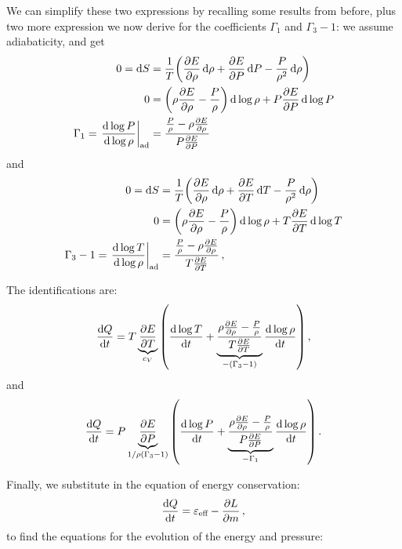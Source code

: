 \documentclass[main.tex]{subfiles}
\begin{document}
We can simplify these two expressions by recalling some results from before, plus two more expression we now derive for the coefficients \(\Gamma_1\) and \(\Gamma_3 -1\): we assume adiabaticity, and get
%
\begin{subequations}
\begin{align}
0=\dd{S} &= \frac{1}{T} \qty(\pdv{E}{\rho } \dd{\rho } + \pdv{E}{P } \dd{P} - \frac{P}{\rho^2} \dd{\rho })  \\
0&= \qty(\rho \pdv{E}{\rho } - \frac{P}{\rho } ) \dd{\log \rho }   + P \pdv{E}{P} \dd{\log P}  \\
\Gamma_1 = \left. \dv{\log P}{\log \rho } \right\vert_{\text{ad}} &= \frac{\frac{P}{\rho } - \rho \pdv{E}{\rho }}{P \pdv{E}{P}}
\,
\end{align}
\end{subequations}
%
and 
%
\begin{subequations}
\begin{align}
0 = \dd{S} &= \frac{1}{T} \qty(\pdv{E}{\rho } \dd{\rho } + \pdv{E}{T} \dd{T} - \frac{P}{\rho^2} \dd{\rho })  \\
0&= \qty(\rho \pdv{E}{ \rho } - \frac{P}{\rho }) \dd{\log \rho } + T \pdv{E}{T} \dd{\log T}  \\
\Gamma_3 -1 = \left. \dv{\log T}{\log \rho } \right\vert_{\text{ad}} &= \frac{\frac{P}{\rho } - \rho \pdv{E}{\rho }}{T \pdv{E}{T}}
\,,
\end{align}
\end{subequations}
%


The identifications are: 
%
\begin{align}
\dv{Q}{t} = T \underbrace{\pdv{E}{T}}_{c_V} \qty(\dv{\log T}{t} + \underbrace{\frac{\rho \pdv{E}{\rho } - \frac{P}{\rho }}{T \pdv{E}{T}}}_{- (\Gamma_3 - 1) } \dv{\log \rho }{t})
\,,
\end{align}
%
and
%
%
\begin{align}
\dv{Q}{t} = P \underbrace{\pdv{E}{P}}_{1/ \rho (\Gamma_3 -1)} \qty(\dv{\log P}{t} + \underbrace{\frac{\rho \pdv{E}{\rho } - \frac{P}{\rho }}{P \pdv{E}{P}}}_{- \Gamma_1 } \dv{\log \rho }{t})
\,.
\end{align}

Finally, we substitute in the equation of energy conservation: 
%
\begin{align}
\dv{Q}{t} = \varepsilon_{\text{eff}} - \pdv{L}{m}
\,,
\end{align}
%
to find the equations for the evolution of the energy and pressure:
%
\end{document}
